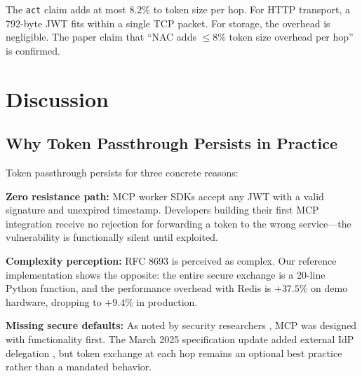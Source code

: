 \documentclass[journal]{IEEEtran}
\begin{document}
The \texttt{act} claim adds at most $8.2\%$ to token size per hop. For HTTP transport, a 792-byte JWT fits within a single TCP packet. For storage, the overhead is negligible. The paper claim that ``NAC adds $\leq 8\%$ token size overhead per hop'' is confirmed.



\section{Discussion}
\label{sec:discussion}

\subsection{Why Token Passthrough Persists in Practice}

Token passthrough persists for three concrete reasons:

\textbf{Zero resistance path:} MCP worker SDKs accept any JWT with a valid signature and unexpired timestamp. Developers building their first MCP integration receive no rejection for forwarding a token to the wrong service—the vulnerability is functionally silent until exploited.

\textbf{Complexity perception:} RFC 8693 is perceived as complex. Our reference implementation shows the opposite: the entire secure exchange is a 20-line Python function, and the performance overhead with Redis is $+37.5\%$ on demo hardware, dropping to $+9.4\%$ in production.

\textbf{Missing secure defaults:} As noted by security researchers \cite{mcp_sec_medium_2025}, MCP was designed with functionality first. The March 2025 specification update added external IdP delegation \cite{mcp_spec_2025}, but token exchange at each hop remains an optional best practice rather than a mandated behavior.
\end{document}
